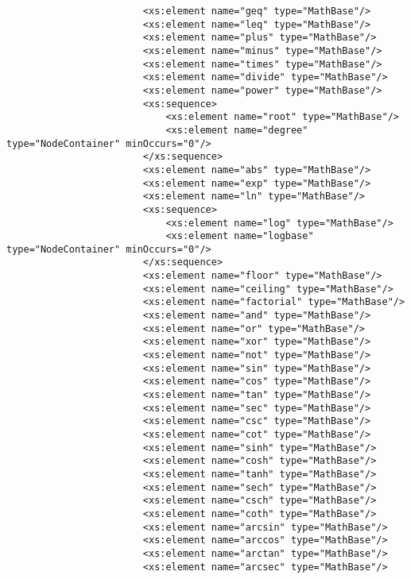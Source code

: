 \begin{footnotesize}
\begin{verbatim}
                        <xs:element name="geq" type="MathBase"/>
                        <xs:element name="leq" type="MathBase"/>
                        <xs:element name="plus" type="MathBase"/>
                        <xs:element name="minus" type="MathBase"/>
                        <xs:element name="times" type="MathBase"/>
                        <xs:element name="divide" type="MathBase"/>
                        <xs:element name="power" type="MathBase"/>
                        <xs:sequence>
                            <xs:element name="root" type="MathBase"/>
                            <xs:element name="degree" type="NodeContainer" minOccurs="0"/>
                        </xs:sequence>
                        <xs:element name="abs" type="MathBase"/>
                        <xs:element name="exp" type="MathBase"/>
                        <xs:element name="ln" type="MathBase"/>
                        <xs:sequence>
                            <xs:element name="log" type="MathBase"/>
                            <xs:element name="logbase" type="NodeContainer" minOccurs="0"/>
                        </xs:sequence>
                        <xs:element name="floor" type="MathBase"/>
                        <xs:element name="ceiling" type="MathBase"/>
                        <xs:element name="factorial" type="MathBase"/>
                        <xs:element name="and" type="MathBase"/>
                        <xs:element name="or" type="MathBase"/>
                        <xs:element name="xor" type="MathBase"/>
                        <xs:element name="not" type="MathBase"/>
                        <xs:element name="sin" type="MathBase"/>
                        <xs:element name="cos" type="MathBase"/>
                        <xs:element name="tan" type="MathBase"/>
                        <xs:element name="sec" type="MathBase"/>
                        <xs:element name="csc" type="MathBase"/>
                        <xs:element name="cot" type="MathBase"/>
                        <xs:element name="sinh" type="MathBase"/>
                        <xs:element name="cosh" type="MathBase"/>
                        <xs:element name="tanh" type="MathBase"/>
                        <xs:element name="sech" type="MathBase"/>
                        <xs:element name="csch" type="MathBase"/>
                        <xs:element name="coth" type="MathBase"/>
                        <xs:element name="arcsin" type="MathBase"/>
                        <xs:element name="arccos" type="MathBase"/>
                        <xs:element name="arctan" type="MathBase"/>
                        <xs:element name="arcsec" type="MathBase"/>

\end{verbatim}
\end{footnotesize}
